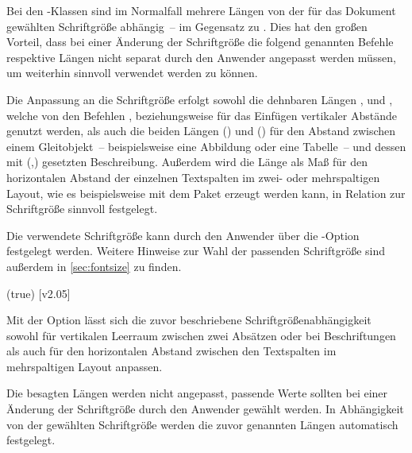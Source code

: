\begin{DeclareEntity*}{}
\begin{DeclareEntity*}{}
\begin{DeclareEntity*}{}
%
Bei den \TUDScript-Klassen sind im Normalfall mehrere Längen von der für das 
Dokument gewählten Schriftgröße abhängig~-- im Gegensatz zu \KOMAScript. Dies 
hat den großen Vorteil, dass bei einer Änderung der Schriftgröße die folgend 
genannten Befehle respektive Längen nicht separat durch den Anwender angepasst 
werden müssen, um weiterhin sinnvoll verwendet werden zu können.

Die Anpassung an die Schriftgröße erfolgt sowohl die dehnbaren Längen 
,  und , 
welche von den Befehlen ,  beziehungsweise 
 für das Einfügen vertikaler Abstände genutzt werden, als auch 
die beiden Längen () und 
() für den Abstand zwischen 
einem Gleitobjekt~-- beispielsweise eine Abbildung oder eine Tabelle~-- und 
dessen mit (,) 
gesetzten Beschreibung. Außerdem wird die Länge  als Maß für 
den horizontalen Abstand der einzelnen Textspalten im zwei- oder mehrspaltigen 
Layout, wie es beispielsweise mit dem Paket  erzeugt werden 
kann, in Relation zur Schriftgröße sinnvoll festgelegt.

Die verwendete Schriftgröße kann durch den Anwender über die \KOMAScript-Option 
 festgelegt 
werden.
Weitere Hinweise zur Wahl der passenden Schriftgröße sind außerdem in 
\autoref{sec:fontsize} zu finden.

\begin{Declaration}
  {}
  (true)
  [v2.05]
\printdeclarationlist

Mit der Option  lässt sich die zuvor beschriebene 
Schriftgrößenabhängigkeit sowohl für vertikalen Leerraum zwischen zwei Absätzen 
oder bei Beschriftungen als auch für den horizontalen Abstand zwischen den 
Textspalten im mehrspaltigen Layout anpassen.
\begin{DeclareValues}
  Die besagten Längen werden nicht angepasst, passende Werte sollten bei einer 
  Änderung der Schriftgröße durch den Anwender gewählt werden.
  In Abhängigkeit von der gewählten Schriftgröße werden die zuvor genannten 
  Längen automatisch festgelegt.
\end{DeclareValues}
\end{Declaration}




\end{DeclareEntity*}
\end{DeclareEntity*}
\end{DeclareEntity*}
